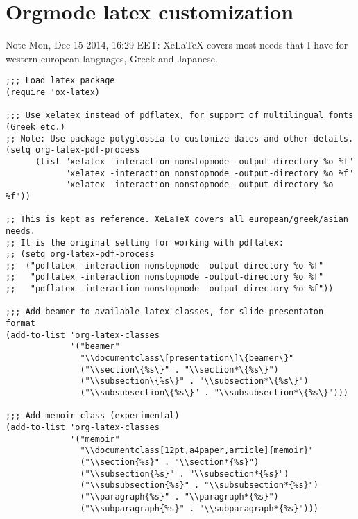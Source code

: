 \documentclass[10pt]{article}
\begin{document}
\section{Orgmode latex customization}
\label{sec-11}

Note Mon, Dec 15 2014, 16:29 EET: XeLaTeX covers most needs that I have for western european languages, Greek and Japanese.

\begin{verbatim}
;;; Load latex package
(require 'ox-latex)

;;; Use xelatex instead of pdflatex, for support of multilingual fonts (Greek etc.)
;; Note: Use package polyglossia to customize dates and other details.
(setq org-latex-pdf-process
      (list "xelatex -interaction nonstopmode -output-directory %o %f"
            "xelatex -interaction nonstopmode -output-directory %o %f"
            "xelatex -interaction nonstopmode -output-directory %o %f"))

;; This is kept as reference. XeLaTeX covers all european/greek/asian needs.
;; It is the original setting for working with pdflatex:
;; (setq org-latex-pdf-process
;;  ("pdflatex -interaction nonstopmode -output-directory %o %f"
;;   "pdflatex -interaction nonstopmode -output-directory %o %f"
;;   "pdflatex -interaction nonstopmode -output-directory %o %f"))

;;; Add beamer to available latex classes, for slide-presentaton format
(add-to-list 'org-latex-classes
             '("beamer"
               "\\documentclass\[presentation\]\{beamer\}"
               ("\\section\{%s\}" . "\\section*\{%s\}")
               ("\\subsection\{%s\}" . "\\subsection*\{%s\}")
               ("\\subsubsection\{%s\}" . "\\subsubsection*\{%s\}")))

;;; Add memoir class (experimental)
(add-to-list 'org-latex-classes
             '("memoir"
               "\\documentclass[12pt,a4paper,article]{memoir}"
               ("\\section{%s}" . "\\section*{%s}")
               ("\\subsection{%s}" . "\\subsection*{%s}")
               ("\\subsubsection{%s}" . "\\subsubsection*{%s}")
               ("\\paragraph{%s}" . "\\paragraph*{%s}")
               ("\\subparagraph{%s}" . "\\subparagraph*{%s}")))


\end{verbatim}
\end{document}
